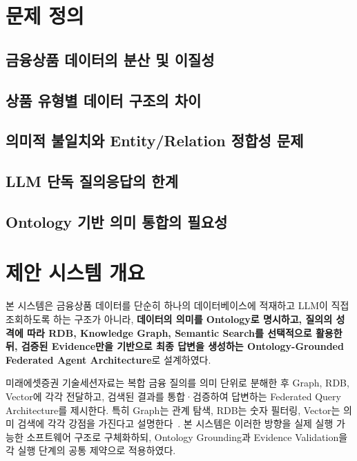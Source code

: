 \documentclass[11pt,a4paper]{article}
\begin{document}
\section{문제 정의}

\subsection{금융상품 데이터의 분산 및 이질성}


\subsection{상품 유형별 데이터 구조의 차이}


\subsection{의미적 불일치와 Entity/Relation 정합성 문제}


\subsection{LLM 단독 질의응답의 한계}


\subsection{Ontology 기반 의미 통합의 필요성}


\section{제안 시스템 개요}

본 시스템은 금융상품 데이터를 단순히 하나의 데이터베이스에 적재하고
LLM이 직접 조회하도록 하는 구조가 아니라,
\textbf{데이터의 의미를 Ontology로 명시하고,
질의의 성격에 따라 RDB, Knowledge Graph, Semantic Search를 선택적으로 활용한 뒤,
검증된 Evidence만을 기반으로 최종 답변을 생성하는
Ontology-Grounded Federated Agent Architecture}로 설계하였다.

미래에셋증권 기술세션자료는 복합 금융 질의를
의미 단위로 분해한 후 Graph, RDB, Vector에 각각 전달하고,
검색된 결과를 통합·검증하여 답변하는 Federated Query Architecture를 제시한다.
특히 Graph는 관계 탐색, RDB는 숫자 필터링,
Vector는 의미 검색에 각각 강점을 가진다고 설명한다~\cite[21--22쪽]{mirae-tech}.
본 시스템은 이러한 방향을 실제 실행 가능한 소프트웨어 구조로 구체화하되,
Ontology Grounding과 Evidence Validation을
각 실행 단계의 공통 제약으로 적용하였다.
\end{document}
